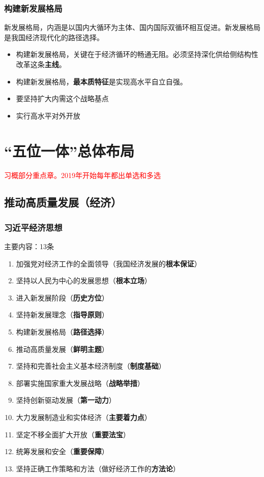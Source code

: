 \documentclass[12pt, a4paper, oneside]{ctexart}
\begin{document}
\subsubsection{构建新发展格局}

新发展格局，内涵是以国内大循环为主体、国内国际双循环相互促进。新发展格局是我国经济现代化的路径选择。

\begin{itemize}
  \item 构建新发展格局，关键在于经济循环的畅通无阻。必须坚持深化供给侧结构性改革这条\textbf{主线}。
  \item 构建新发展格局，\textbf{最本质特征}是实现高水平自立自强。
  \item 要坚持扩大内需这个战略基点
  \item 实行高水平对外开放
\end{itemize}

\section{“五位一体”总体布局}

\textcolor{red}{习概部分重点章。2019年开始每年都出单选和多选}

\subsection{推动高质量发展（经济）}

\subsubsection{习近平经济思想}

主要内容：13条

\begin{enumerate}
  \item 加强党对经济工作的全面领导（我国经济发展的\textbf{根本保证}）
  \item 坚持以人民为中心的发展思想（\textbf{根本立场}）
  \item 进入新发展阶段（\textbf{历史方位}）
  \item 坚持新发展理念（\textbf{指导原则}）
  \item 构建新发展格局（\textbf{路径选择}）
  \item 推动高质量发展（\textbf{鲜明主题}）
  \item 坚持和完善社会主义基本经济制度（\textbf{制度基础}）
  \item 部署实施国家重大发展战略（\textbf{战略举措}）
  \item 坚持创新驱动发展（\textbf{第一动力}）
  \item 大力发展制造业和实体经济（\textbf{主要着力点}）
  \item 坚定不移全面扩大开放（\textbf{重要法宝}）
  \item 统筹发展和安全（\textbf{重要保障}）
  \item 坚持正确工作策略和方法（做好经济工作的\textbf{方法论}）
\end{enumerate}
\end{document}
